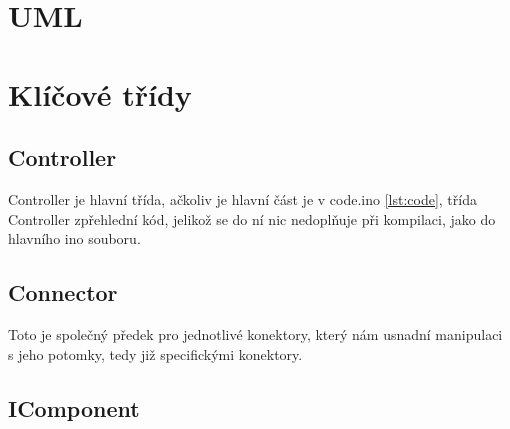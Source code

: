 
\section{UML}

\section{Klíčové třídy}

\newpage
\subsection{Controller}

Controller je hlavní třída, ačkoliv je hlavní část je v code.ino \ref{lst:code}, třída Controller zpřehlední kód, jelikož se do ní nic nedoplňuje při kompilaci, jako do hlavního ino souboru.

\newpage
\subsection{Connector}

Toto je společný předek pro jednotlivé konektory, který nám usnadní manipulaci s jeho potomky, tedy již specifickými konektory.

\newpage
\subsection{IComponent}


